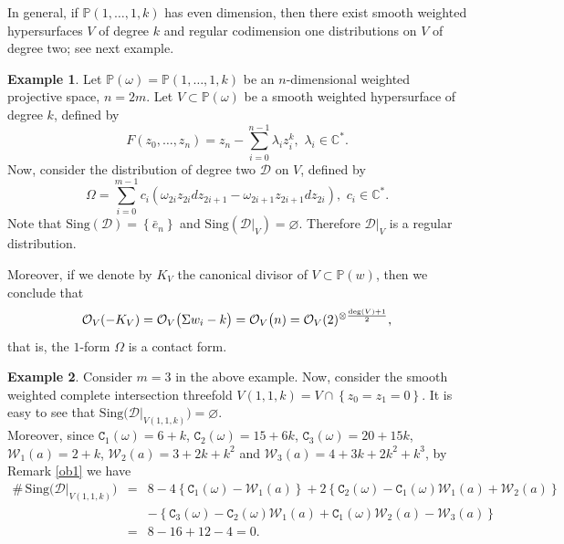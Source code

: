 \documentclass[11pt]{amsart}
\theoremstyle{plain}
\theoremstyle{definition}
\newtheorem{exe}{Example}[section]
\begin{document}
In general, if $\mathbb{P}(1,\ldots,1,k)$ has even dimension, then there exist smooth weighted hypersurfaces $V$ of degree $k$
and regular codimension one distributions on $V$ of degree two; see next example. 

\begin{exe} \label{exee} Let $\mathbb{P}(\omega)=\mathbb{P}(1,\ldots,1,k)$ be an $n$-dimensional weighted projective space, $n=2m$.
Let $V\subset\mathbb{P}(\omega)$ be a smooth weighted hypersurface of degree $k$, defined by
$$F(z_0,\ldots,z_n)=z_n-\sum_{i=0}^{n-1}\lambda_iz_i^k,\,\,\lambda_i\in\mathbb{C}^{\ast}.$$
Now, consider the distribution of degree two $\mathcal{D}$ on $V$, defined by 
$$\Omega=\sum_{i=0}^{m-1}c_i\left(\omega_{2i}z_{2i}dz_{2i+1}-\omega_{2i+1}z_{2i+1}dz_{2i}\right),\,\,c_i\in\mathbb{C}^{\ast}.$$
Note that $\mathrm{Sing}\left(\mathcal{D}\right)=\left\{\bar{e}_n\right\}$ and 
$\mathrm{Sing}\left(\mathcal{D}|_V\right)=\varnothing$. Therefore $\mathcal{D}|_V$ is a regular distribution.  

Moreover, if we denote by $K_V$ the canonical divisor 
of $V\subset\mathbb{P}(w)$, then we conclude that
$$\mathcal{O}_V\hspace{-0.07cm}\left(-K_V\right)=\mathcal{O}_V\big(\Sigma w_i-k\big)
=\mathcal{O}_V\big(n)=\mathcal{O}_V(2)^{\otimes \frac{\mathrm{deg}(V)+1}{2}},$$
that is, the $1$-form $\Omega$ is a contact form. 
\end{exe} 

\begin{exe} \label{eexe} Consider $m=3$ in the above example. Now, consider the smooth weighted complete intersection threefold 
$V(1,1,k)=V\cap\left\{z_0=z_1=0\right\}$. It is easy to see that 
$\mathrm{Sing}\big(\mathcal{D}|_{V(1,1,k)}\big)=\varnothing$. \\

Moreover, since $\texttt{C}_1(\omega)=6+k$, $\texttt{C}_2(\omega)=15+6k$, $\texttt{C}_3(\omega)=20+15k$, $\mathcal{W}_1(a)=2+k$, 
$\mathcal{W}_2(a)=3+2k+k^2$ and $\mathcal{W}_3(a)=4+3k+2k^2+k^3$, by Remark \ref{ob1} we have
\begin{eqnarray*}
\#\,\mathrm{Sing}\big(\mathcal{D}|_{V(1,1,k)}\big)&=&8-4\left\{\texttt{C}_1(\omega)-\mathcal{W}_1(a)\right\}
+2\left\{\texttt{C}_2(\omega)-\texttt{C}_1(\omega)\mathcal{W}_1(a)+\mathcal{W}_2(a)\right\} \\
&&-\left\{\texttt{C}_3(\omega)-\texttt{C}_2(\omega)\mathcal{W}_1(a)+\texttt{C}_1(\omega)\mathcal{W}_2(a)-\mathcal{W}_3(a)\right\} \\
&=&8-16+12-4=0.
\end{eqnarray*}
\end{exe} 
\end{document}
